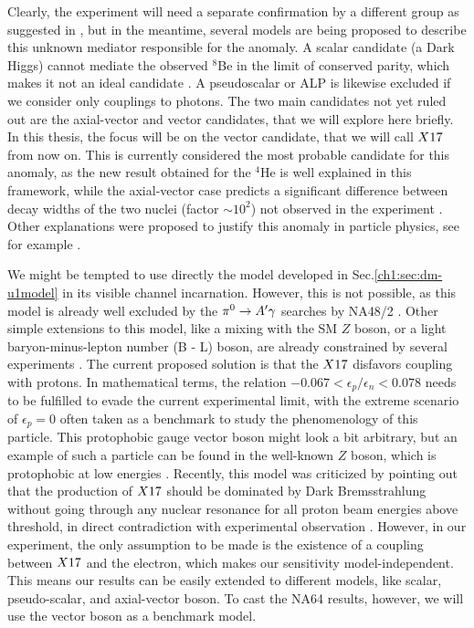 Clearly, the experiment will need a separate confirmation by a different group as suggested in \cite{Feng:2020mbt}, but in the meantime, several models are being proposed to describe this unknown mediator responsible for the anomaly. A scalar candidate (a Dark Higgs) cannot mediate the observed $^8$Be in the limit of conserved parity, which makes it not an ideal candidate \cite{PhysRevD.95.035017}. A pseudoscalar or ALP is likewise excluded if we consider only couplings to photons. The two main candidates not yet ruled out are the axial-vector and vector candidates, that we will explore here briefly. In this thesis, the focus will be on the vector candidate, that we will call $X17$ from now on. This is currently considered the most probable candidate for this anomaly, as the new result obtained for the $^4$He is well explained in this framework, while the axial-vector case predicts a significant difference between decay widths of the two nuclei (factor $\sim10^2$) not observed in the experiment \cite{Feng:2020mbt}. Other explanations were proposed to justify this anomaly in particle physics, see for example \cite{Nam:2019osu, Seto:2016pks}.

We might be tempted to use directly the model developed in Sec.\ref{ch1:sec:dm-u1model} in its visible channel incarnation. However, this is not possible, as this model is already well excluded by the $\pi^0 \to A' \gamma$ searches by NA48/2 \cite{na48}. Other simple extensions to this model, like a mixing with the SM $Z$ boson, or a light baryon-minus-lepton number (B - L) boson, are already constrained by several experiments \cite{PhysRevD.95.035017}. The current proposed solution is that the $X17$ disfavors coupling with protons. In mathematical terms, the relation $-0.067 < \epsilon_p/\epsilon_n < 0.078$ needs to be fulfilled to evade the current experimental limit, with the extreme scenario of $\epsilon_p = 0$ often taken as a benchmark to study the phenomenology of this particle. This protophobic gauge vector boson might look a bit arbitrary, but an example of such a particle can be found in the well-known $Z$ boson, which is protophobic at low energies \cite{PhysRevD.95.035017}. Recently, this model was criticized by pointing out that the production of $X17$ should be dominated by Dark Bremsstrahlung without going through any nuclear resonance for all proton beam energies above threshold, in direct contradiction with experimental observation \cite{zhang2020protophobic}.  However, in our experiment, the only assumption to be made is the existence of a coupling between $X17$ and the electron, which makes our sensitivity model-independent. This means our results can be easily extended to different models, like scalar, pseudo-scalar, and axial-vector boson. To cast the NA64 results, however, we will use the vector boson as a benchmark model.

